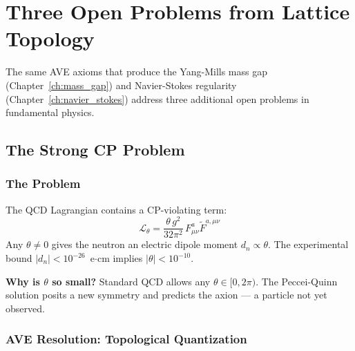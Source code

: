 
\chapter{Three Open Problems from Lattice Topology}
\label{ch:open_problems}

The same AVE axioms that produce the Yang-Mills mass gap
(Chapter~\ref{ch:mass_gap}) and Navier-Stokes regularity
(Chapter~\ref{ch:navier_stokes}) address three additional open
problems in fundamental physics.

\section{The Strong CP Problem}
\label{sec:strong_cp}

\subsection{The Problem}

The QCD Lagrangian contains a CP-violating term:
\begin{equation}
    \mathcal{L}_\theta = \frac{\theta\, g^2}{32\pi^2}\,
    F^a_{\mu\nu} \tilde{F}^{a,\mu\nu}
    \label{eq:theta_term}
\end{equation}
Any $\theta \ne 0$ gives the neutron an electric dipole moment
$d_n \propto \theta$.  The experimental bound
$|d_n| < 10^{-26}$~e$\cdot$cm implies $|\theta| < 10^{-10}$.

\textbf{Why is $\theta$ so small?}  Standard QCD allows any
$\theta \in [0, 2\pi)$.  The Peccei-Quinn solution posits a
new symmetry and predicts the axion --- a particle not yet observed.

\subsection{AVE Resolution: Topological Quantization}

\noindent{}

